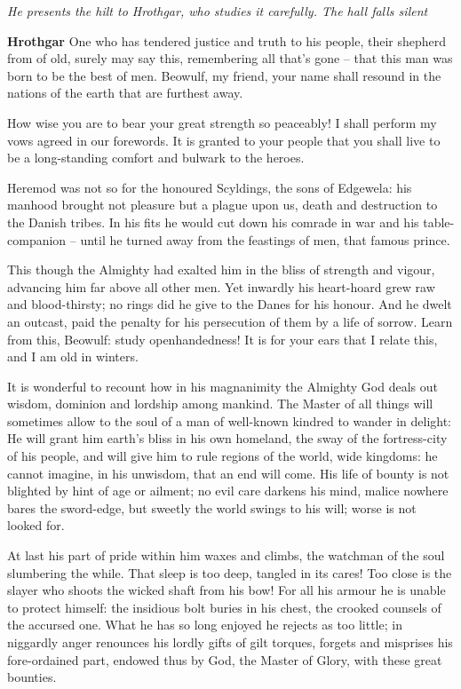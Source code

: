 \documentclass[a4paper]{article}
\begin{document}
{\centerline{\textit{He presents the hilt to Hrothgar, who studies it carefully. The hall falls silent}}

\textbf{Hrothgar} One who has tendered justice and truth to his people,
 their shepherd from of old, surely may say this,
remembering all that’s gone – that this man was born
to be the best of men. Beowulf, my friend,
your name shall resound in the nations of the earth
that are furthest away.

How wise you are to bear
your great strength so peaceably! I shall perform my vows
agreed in our forewords. It is granted to your people
that you shall live to be a long-standing comfort
and bulwark to the heroes.

Heremod was not so
for the honoured Scyldings, the sons of Edgewela:
his manhood brought not pleasure but a plague upon us,
death and destruction to the Danish tribes.
In his fits he would cut down his comrade in war
and his table-companion – until he turned away
from the feastings of men, that famous prince.

This though the Almighty had exalted him in the bliss
of strength and vigour, advancing him far
above all other men. Yet inwardly his heart-hoard
grew raw and blood-thirsty; no rings did he give
to the Danes for his honour. And he dwelt an outcast,
paid the penalty for his persecution of them
by a life of sorrow. Learn from this, Beowulf:
study openhandedness! It is for your ears that I relate this,
and I am old in winters.

It is wonderful to recount
how in his magnanimity the Almighty God
deals out wisdom, dominion and lordship
among mankind. The Master of all things
will sometimes allow to the soul of a man
of well-known kindred to wander in delight:
He will grant him earth’s bliss in his own homeland,
the sway of the fortress-city of his people,
and will give him to rule regions of the world,
wide kingdoms: he cannot imagine,
in his unwisdom, that an end will come.
His life of bounty is not blighted by hint
of age or ailment; no evil care
darkens his mind, malice nowhere
bares the sword-edge, but sweetly the world
swings to his will; worse is not looked for.

At last his part of pride within him
waxes and climbs, the watchman of the soul
slumbering the while. That sleep is too deep,
tangled in its cares! Too close is the slayer
who shoots the wicked shaft from his bow!
For all his armour he is unable to protect himself:
the insidious bolt buries in his chest,
the crooked counsels of the accursed one.
What he has so long enjoyed he rejects as too little;
in niggardly anger renounces his lordly
gifts of gilt torques, forgets and misprises
his fore-ordained part, endowed thus by God,
the Master of Glory, with these great bounties.

}
\end{document}
